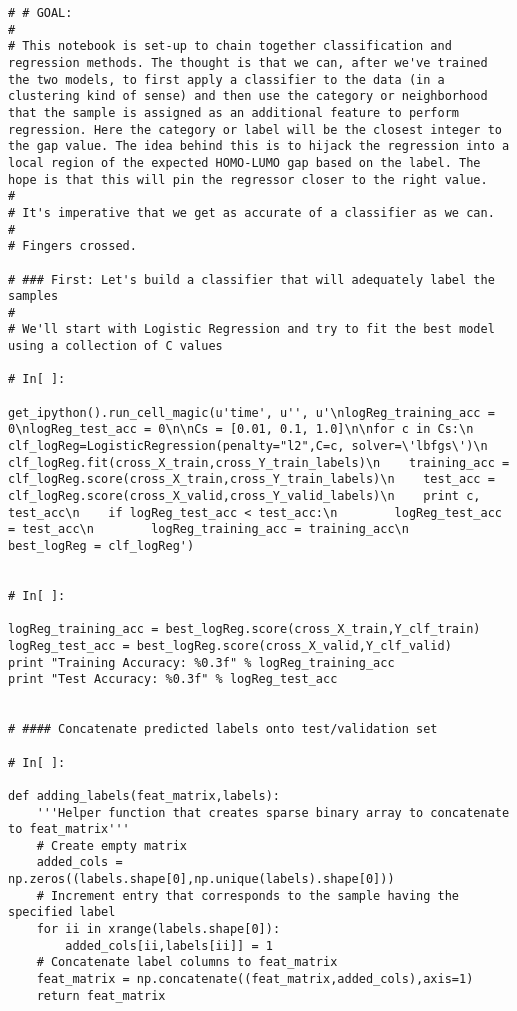 \documentclass[11pt, oneside]{article}   	%
\begin{document}
\begin{lstlisting}
# # GOAL:
# 
# This notebook is set-up to chain together classification and regression methods. The thought is that we can, after we've trained the two models, to first apply a classifier to the data (in a clustering kind of sense) and then use the category or neighborhood that the sample is assigned as an additional feature to perform regression. Here the category or label will be the closest integer to the gap value. The idea behind this is to hijack the regression into a local region of the expected HOMO-LUMO gap based on the label. The hope is that this will pin the regressor closer to the right value. 
# 
# It's imperative that we get as accurate of a classifier as we can.
# 
# Fingers crossed.

# ### First: Let's build a classifier that will adequately label the samples
# 
# We'll start with Logistic Regression and try to fit the best model using a collection of C values

# In[ ]:

get_ipython().run_cell_magic(u'time', u'', u'\nlogReg_training_acc = 0\nlogReg_test_acc = 0\n\nCs = [0.01, 0.1, 1.0]\n\nfor c in Cs:\n    clf_logReg=LogisticRegression(penalty="l2",C=c, solver=\'lbfgs\')\n    clf_logReg.fit(cross_X_train,cross_Y_train_labels)\n    training_acc = clf_logReg.score(cross_X_train,cross_Y_train_labels)\n    test_acc = clf_logReg.score(cross_X_valid,cross_Y_valid_labels)\n    print c, test_acc\n    if logReg_test_acc < test_acc:\n        logReg_test_acc = test_acc\n        logReg_training_acc = training_acc\n        best_logReg = clf_logReg')


# In[ ]:

logReg_training_acc = best_logReg.score(cross_X_train,Y_clf_train)
logReg_test_acc = best_logReg.score(cross_X_valid,Y_clf_valid)
print "Training Accuracy: %0.3f" % logReg_training_acc
print "Test Accuracy: %0.3f" % logReg_test_acc


# #### Concatenate predicted labels onto test/validation set

# In[ ]:

def adding_labels(feat_matrix,labels):
    '''Helper function that creates sparse binary array to concatenate to feat_matrix'''
    # Create empty matrix 
    added_cols = np.zeros((labels.shape[0],np.unique(labels).shape[0]))
    # Increment entry that corresponds to the sample having the specified label
    for ii in xrange(labels.shape[0]):
        added_cols[ii,labels[ii]] = 1
    # Concatenate label columns to feat_matrix
    feat_matrix = np.concatenate((feat_matrix,added_cols),axis=1)
    return feat_matrix



\end{lstlisting}
\end{document}
